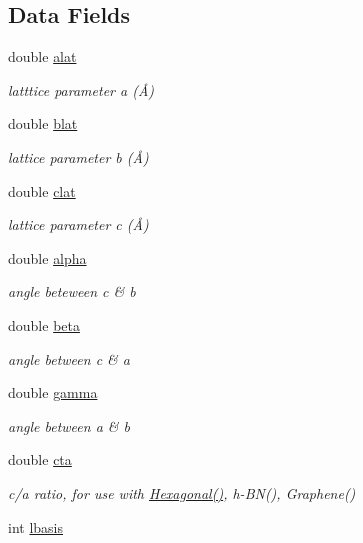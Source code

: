 \subsection*{Data Fields}
\begin{DoxyCompactItemize}
\item 
double \hyperlink{class_gui_a1f0bf13bd26f8dbb3756f4475d50ea3b}{alat}
\begin{DoxyCompactList}\small\item\em latttice parameter a (Å) \end{DoxyCompactList}\item 
double \hyperlink{class_gui_a2bf9af74005d7da17b63c00328831fd3}{blat}
\begin{DoxyCompactList}\small\item\em lattice parameter b (Å) \end{DoxyCompactList}\item 
double \hyperlink{class_gui_ac92e0603324d6b978d1813d0d0c2bef9}{clat}
\begin{DoxyCompactList}\small\item\em lattice parameter c (Å) \end{DoxyCompactList}\item 
double \hyperlink{class_gui_af21a8a5ef3954775896ef3ebc4f12ec5}{alpha}
\begin{DoxyCompactList}\small\item\em angle beteween c \& b \end{DoxyCompactList}\item 
double \hyperlink{class_gui_a2b89466ec45a283f6d7b94b6ffc36640}{beta}
\begin{DoxyCompactList}\small\item\em angle between c \& a \end{DoxyCompactList}\item 
double \hyperlink{class_gui_abe1f84fa6c83a5b3b0d939e6be73d3b5}{gamma}
\begin{DoxyCompactList}\small\item\em angle between a \& b \end{DoxyCompactList}\item 
double \hyperlink{class_gui_a105eb1ab34dee685c11005e47c44ee16}{cta}
\begin{DoxyCompactList}\small\item\em c/a ratio, for use with \hyperlink{class_hexagonal}{Hexagonal()}, h-\/\+B\+N(), Graphene() \end{DoxyCompactList}\item 
int \hyperlink{class_gui_a8c9eebe2e978c4d0bc1bef77905c7738}{lbasis}

\end{DoxyCompactItemize}
